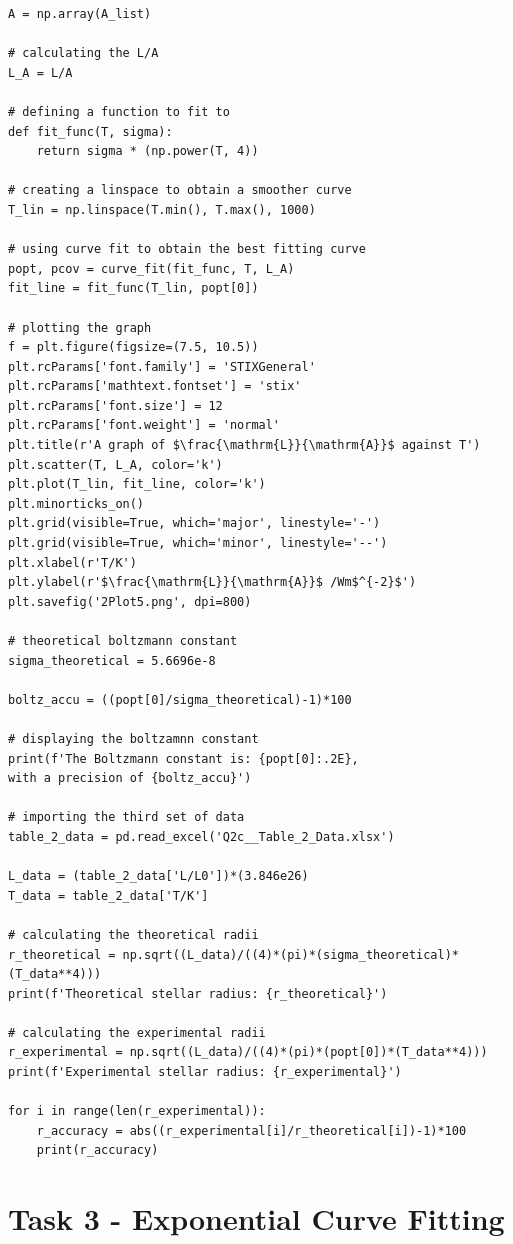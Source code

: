 \documentclass[12pt, a4paper]{article}
\begin{document}
\begin{verbatim}
A = np.array(A_list)

# calculating the L/A
L_A = L/A

# defining a function to fit to
def fit_func(T, sigma):
    return sigma * (np.power(T, 4))

# creating a linspace to obtain a smoother curve
T_lin = np.linspace(T.min(), T.max(), 1000)

# using curve fit to obtain the best fitting curve
popt, pcov = curve_fit(fit_func, T, L_A)
fit_line = fit_func(T_lin, popt[0])

# plotting the graph
f = plt.figure(figsize=(7.5, 10.5))
plt.rcParams['font.family'] = 'STIXGeneral'
plt.rcParams['mathtext.fontset'] = 'stix'
plt.rcParams['font.size'] = 12
plt.rcParams['font.weight'] = 'normal'
plt.title(r'A graph of $\frac{\mathrm{L}}{\mathrm{A}}$ against T')
plt.scatter(T, L_A, color='k')
plt.plot(T_lin, fit_line, color='k')
plt.minorticks_on()
plt.grid(visible=True, which='major', linestyle='-')
plt.grid(visible=True, which='minor', linestyle='--')
plt.xlabel(r'T/K')
plt.ylabel(r'$\frac{\mathrm{L}}{\mathrm{A}}$ /Wm$^{-2}$')
plt.savefig('2Plot5.png', dpi=800)

# theoretical boltzmann constant
sigma_theoretical = 5.6696e-8 

boltz_accu = ((popt[0]/sigma_theoretical)-1)*100

# displaying the boltzamnn constant
print(f'The Boltzmann constant is: {popt[0]:.2E}, 
with a precision of {boltz_accu}')

# importing the third set of data
table_2_data = pd.read_excel('Q2c__Table_2_Data.xlsx')

L_data = (table_2_data['L/L0'])*(3.846e26)    
T_data = table_2_data['T/K']                              

# calculating the theoretical radii
r_theoretical = np.sqrt((L_data)/((4)*(pi)*(sigma_theoretical)*(T_data**4)))
print(f'Theoretical stellar radius: {r_theoretical}')

# calculating the experimental radii
r_experimental = np.sqrt((L_data)/((4)*(pi)*(popt[0])*(T_data**4)))
print(f'Experimental stellar radius: {r_experimental}')

for i in range(len(r_experimental)):
    r_accuracy = abs((r_experimental[i]/r_theoretical[i])-1)*100
    print(r_accuracy)

\end{verbatim}

\section{Task 3 - Exponential Curve Fitting}
\end{document}
